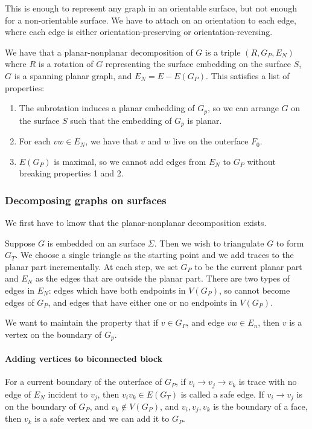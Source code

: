 \documentclass[]{report}
\theoremstyle{definition}
\numberwithin{theorem}{section}
\numberwithin{equation}{section}
\begin{document}
This is enough to represent any graph in an orientable surface, but not enough for a non-orientable surface. We have to attach on an orientation to each edge, where each edge is either orientation-preserving or orientation-reversing. 

We have that a planar-nonplanar decomposition of $G$ is a triple $(R, G_P, E_N)$ where $R$ is a rotation of $G$ representing the surface embedding on the surface $S$, $G$ is a spanning planar graph, and $E_N = E - E(G_P)$. 
This satisfies a list of properties:
\begin{enumerate}
	\item The subrotation induces a planar embedding of $G_p$, so we can arrange $G$ on the surface $S$ such that the embedding of $G_p$ is planar. 
	\item For each $vw \in E_N$, we have that $v$ and $w$ live on the outerface $F_0$.
	\item $E(G_P)$ is maximal, so we cannot add edges from $E_N$ to $G_P$ without breaking properties 1 and 2. 
\end{enumerate}

\subsubsection{Decomposing graphs on surfaces}\label{sssec:Planar_nonplanar_decomp}
We first have to know that the planar-nonplanar decomposition exists. 

Suppose $G$ is embedded on an surface $\Sigma$. Then we wish to triangulate $G$ to form $G_T$. We choose a single triangle as the starting point and we add traces to the planar part incrementally. At each step, we set $G_P$ to be the current planar part and $E_N$ as the edges that are outside the planar part. There are two types of edges in $E_N$: edges which have both endpoints in $V(G_P)$, so cannot become edges of $G_P$, and edges that have either one or no endpoints in $V(G_P)$. 

We want to maintain the property that if $v \in G_P$, and edge $vw \in E_n$, then $v$ is a vertex on the boundary of $G_p$. 
\paragraph{Adding vertices to biconnected block}
For a current boundary of the outerface of $G_P$, if $v_i \rightarrow v_j \rightarrow v_k$ is trace with no edge of $E_N$ incident to $v_j$, then $v_iv_k \in E(G_T)$ is called a safe edge. If $v_i \rightarrow v_j$ is on the boundary of $G_P$, and $v_k \notin V(G_P)$, and $v_i,v_j,v_k$ is the boundary of a face, then $v_k$ is a safe vertex and we can add it to $G_P$. 
\end{document}
